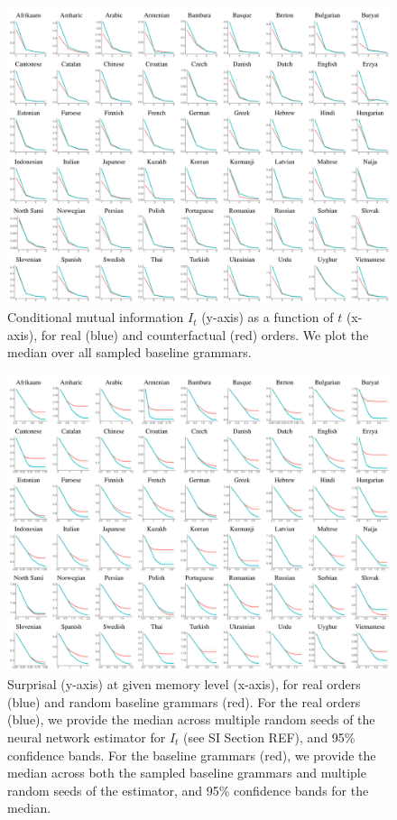 \begin{figure}
	\begin{center}
\includegraphics[width=\textwidth]{it-table.pdf}
\end{center}
	\caption{Conditional mutual information $I_t$ (y-axis) as a function of $t$ (x-axis), for real (blue) and counterfactual (red) orders. We plot the median over all sampled baseline grammars.}\label{fig:it}
\end{figure}



\begin{figure}
	\begin{center}
\includegraphics[width=\textwidth]{results-table.pdf}
\end{center}
	\caption{Surprisal (y-axis) at given memory level (x-axis), for real orders (blue) and random baseline grammars (red).
	For the real orders (blue), we provide the median across multiple random seeds of the neural network estimator for $I_t$ (see SI Section REF), and 95\% confidence bands.
	For the baseline grammars (red), we provide the median across both the sampled baseline grammars and multiple random seeds of the estimator, and 95\% confidence bands for the median.
}\label{fig:median-table}
\end{figure}


